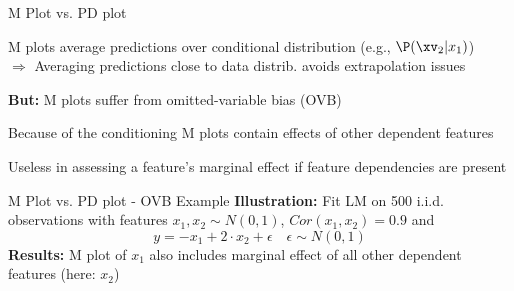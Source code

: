 \documentclass[10pt,compress,t,notes=noshow, xcolor=table]{beamer}
\begin{document}
\begin{framev}[align=top]{M Plot vs. PD plot}
\begin{itemizeM}
\item M plots average predictions over conditional distribution (e.g., $\P(\xv_2|x_1)$)\\
$\Rightarrow$ Averaging predictions close to data distrib. avoids extrapolation issues
\item \textbf{But:} M plots suffer from omitted-variable bias (OVB)
\begin{itemizeS}
\item Because of the conditioning M plots contain effects of other dependent features
\item Useless in assessing a feature's marginal effect if feature dependencies are present
\end{itemizeS}
\end{itemizeM}
\end{framev}


\begin{framev}[align=top]{M Plot vs. PD plot - OVB Example}
\textbf{Illustration:} Fit LM on 500 i.i.d. observations with features $x_1, x_2 \sim N(0,1)$, $Cor(x_1, x_2) = 0.9$ and
$$
y = -x_1 + 2 \cdot x_2 + \epsilon \quad \epsilon \sim N(0,1)
$$
\textbf{Results:} M plot of $x_1$ also includes marginal effect of all other dependent features (here: $x_2$)
\end{framev}
\end{document}
